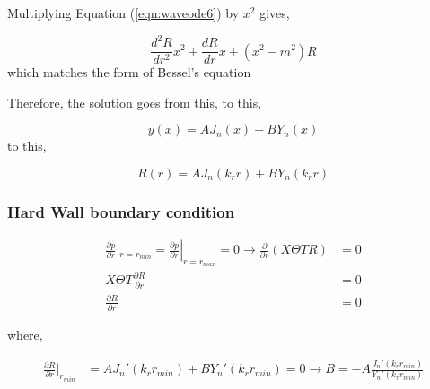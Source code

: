 \begin{frame}
    
Multiplying Equation (\ref{eqn:waveode6}) by $x^2$ gives,

\begin{equation}
    \frac{d^2R}{dr^2}x^2 + 
    \frac{dR}{dr}x + 
    \left( x^2 - m^2 \right)R
    \label{eqn:finalradialode}
\end{equation}
which matches the form of Bessel's equation
\end{frame}
\begin{frame}

Therefore, the solution goes from this,
to this,


\begin{equation}
    y(x) = AJ_n(x) + BY_n(x)
    \label{eqn:besselsolution}
\end{equation}
to this,

\begin{equation}
    R(r) = AJ_n(k_r r) + BY_n(k_r r)
    \label{eqn:besselsolution}
\end{equation}
\end{frame}
\begin{frame}
    
\subsubsection{Hard Wall boundary condition}
\begin{align*}
    \frac{\partial p}{\partial r}|_{r = r_{min}}  =\frac{\partial p}{\partial r}|_{r = r_{max}} = 0 \rightarrow 
    \frac{\partial}{\partial r} \left( X\Theta T R \right) &= 0 \\
    X \Theta T\frac{\partial R}{\partial r}  &= 0 \\
    \frac{\partial R}{\partial r}  &= 0 
\end{align*}

where,


\begin{align*} 
    \frac{ \partial R}{\partial r}|_{r_{min}} &= AJ_n'(k_r r_{min}) + B Y_n' (k_r r_{min}) = 0 
    \rightarrow B = -A \frac{J_n'(k_r r_{min})}{Y_n'(k_r r_{min})}
\end{align*}

\end{frame}
